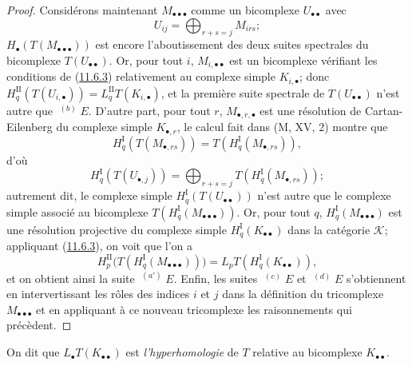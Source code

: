 \begin{proof}
Considérons maintenant $M_{\bullet\bullet\bullet}$ comme un bicomplexe
$U_{\bullet\bullet}$ avec
\[
U_{ij}=\bigoplus_{r+s=j}M_{irs};
\]
$H_\bullet(T(M_{\bullet\bullet\bullet}))$ est encore l'aboutissement des deux
suites spectrales du bicomplexe $T(U_{\bullet\bullet})$. Or, pour tout $i$,
$M_{i,\bullet\bullet}$ est un bicomplexe vérifiant les conditions de
(\hyperref[0.11.6.3-fr]{11.6.3}) relativement au complexe simple
$K_{i,\bullet}$; donc
$H_q^{\mathrm{II}}(T(U_{i,\bullet}))=
L_q^{\mathrm{II}}T(K_{i,\bullet})$, et la première suite spectrale de
$T(U_{\bullet\bullet})$ n'est autre que $\mathop{}^{(b)}E$. D'autre part, pour
tout $r$, $M_{\bullet,r,\bullet}$ est une résolution de Cartan-Eilenberg du
complexe simple $K_{\bullet,r}$, le calcul fait dans (M, XV, 2) montre que
\[
H_q^{\mathrm I}(T(M_{\bullet,rs}))
=T(H_q^{\mathrm I}(M_{\bullet,rs})),
\]
d'où
\[
H_q^{\mathrm I}(T(U_{\bullet,j}))
=\bigoplus_{r+s=j}T(H_q^{\mathrm I}(M_{\bullet,rs}));
\]
autrement dit, le complexe simple
$H_q^{\mathrm I}(T(U_{\bullet\bullet}))$ n'est autre que le complexe simple
associé au bicomplexe
$T(H_q^{\mathrm I}(M_{\bullet\bullet\bullet}))$. Or, pour tout $q$,
$H_q^{\mathrm I}(M_{\bullet\bullet\bullet})$ est une résolution projective du
complexe simple $H_q^{\mathrm I}(K_{\bullet\bullet})$ dans la catégorie
$\mathcal K$; appliquant (\hyperref[0.11.6.3-fr]{11.6.3}), on voit que l'on a
\[
H_p^{\mathrm{II}}
\bigl(T(H_q^{\mathrm I}(M_{\bullet\bullet\bullet}))\bigr)
=L_pT(H_q^{\mathrm I}(K_{\bullet\bullet})),
\]
et on obtient ainsi la suite $\mathop{}^{(a')}E$. Enfin, les suites
$\mathop{}^{(c)}E$ et $\mathop{}^{(d)}E$ s'obtiennent en intervertissant les
rôles des indices $i$ et $j$ dans la définition du tricomplexe
$M_{\bullet\bullet\bullet}$ et en appliquant à ce nouveau tricomplexe les
raisonnements qui précèdent.
\end{proof}

On dit que $L_\bullet T(K_{\bullet\bullet})$ est \emph{l'hyperhomologie} de
$T$ relative au bicomplexe $K_{\bullet\bullet}$.

